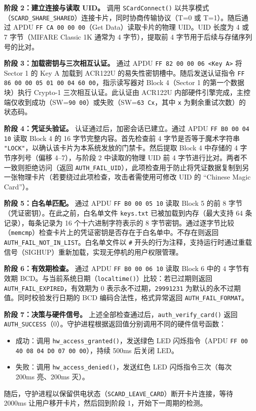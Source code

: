 \documentclass[sigconf]{acmart}
\begin{document}
\textbf{阶段 2：建立连接与读取 UID。} 调用 \texttt{SCardConnect()} 以共享模式（\texttt{SCARD\_SHARE\_SHARED}）连接卡片，同时协商传输协议（T=0 或 T=1）。随后通过 APDU \texttt{FF CA 00 00 00}（Get Data）读取卡片的物理 UID。UID 长度为 4 或 7 字节（MIFARE Classic 1K 通常为 4 字节），提取前 4 字节用于后续与存储序列号的比对。

\textbf{阶段 3：加载密钥与三次相互认证。} 通过 APDU \texttt{FF 82 00 00 06 <Key A>} 将 Sector 1 的 Key A 加载到 ACR122U 的易失性密钥槽中。随后发送认证指令 \texttt{FF 86 00 00 05 01 00 04 60 00}，指示读写器对 Block 4（Sector 1 的第一个数据块）执行 Crypto-1 三次相互认证。此认证由 ACR122U 内部硬件引擎完成，主控端仅收到成功（SW=\texttt{90 00}）或失败（SW=\texttt{63 Cx}，其中 \texttt{x} 为剩余重试次数）的状态码。

\textbf{阶段 4：凭证头验证。} 认证通过后，加密会话已建立。通过 APDU \texttt{FF B0 00 04 10} 读取 Block 4 的 16 字节完整内容。首先检查前 4 字节是否等于魔术字符串 \texttt{"LOCK"}，以确认该卡片为本系统发放的门禁卡。然后提取 Block 4 中存储的 4 字节序列号（偏移 4--7），与阶段 2 中读取的物理 UID 前 4 字节进行比对。两者不一致则拒绝访问（返回 \texttt{AUTH\_FAIL\_UID}），此项检查用于防止将凭证数据复制到另一张物理卡片（若要绕过此项检查，攻击者需使用可修改 UID 的 ``Chinese Magic Card''）。

\textbf{阶段 5：白名单匹配。} 通过 APDU \texttt{FF B0 00 05 10} 读取 Block 5 的前 8 字节（凭证密钥）。在此之前，白名单文件 \texttt{keys.txt} 已被加载到内存（最大支持 64 条记录），每条记录为 16 个十六进制字符表示的 8 字节密钥。通过逐字节比较（\texttt{memcmp}）检查卡片上的凭证密钥是否存在于白名单中。不存在则返回 \texttt{AUTH\_FAIL\_NOT\_IN\_LIST}。白名单文件以 \texttt{\#} 开头的行为注释，支持运行时通过重载信号（SIGHUP）重新加载，实现无停机的用户权限管理。

\textbf{阶段 6：有效期检查。} 通过 APDU \texttt{FF B0 00 06 10} 读取 Block 6 中的 4 字节有效期 BCD。与当前系统日期（\texttt{localtime()}）比较：若已过期则返回 \texttt{AUTH\_FAIL\_EXPIRED}，有效期为 0 表示永不过期，\texttt{29991231} 为默认的永不过期值。同时校验发行日期的 BCD 编码合法性，格式异常返回 \texttt{AUTH\_FAIL\_FORMAT}。

\textbf{阶段 7：决策与硬件信号。} 上述全部检查通过后，\texttt{auth\_verify\_card()} 返回 \texttt{AUTH\_SUCCESS}（0）。守护进程根据返回值分别调用不同的硬件信号函数：
\begin{itemize}
    \item 成功：调用 \texttt{hw\_access\_granted()}，发送绿色 LED 闪烁指令（APDU \texttt{FF 00 40 08 04 D0 07 00 00}），持续 500ms 后关闭 LED。
    \item 失败：调用 \texttt{hw\_access\_denied()}，发送红色 LED 闪烁指令三次（每次 200ms 亮、200ms 灭）。
\end{itemize}
随后，守护进程以保留供电状态（\texttt{SCARD\_LEAVE\_CARD}）断开卡片连接，等待 2000ms 让用户移开卡片，然后回到阶段 1，开始下一周期的检测。
\end{document}
